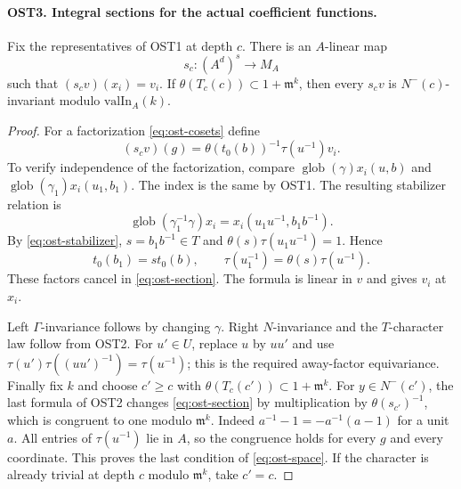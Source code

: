 \documentclass[11pt,a4paper]{article}
\numberwithin{equation}{section}
\theoremstyle{remark}\newtheorem{remark}[theorem]{Remark}
\begin{document}
\paragraph{OST3. Integral sections for the actual coefficient functions.}
\label{claim:OST3}
Fix the representatives of OST1 at depth $c$.  There is an
$A$-linear map
\[
 s_c:(A^d)^s\longrightarrow M_A
\]
such that $(s_c v)(x_i)=v_i$.  If
$\theta(T_c(c))\subset1+\mathfrak m^k$, then every $s_cv$ is
$N^-(c)$-invariant modulo $\mathrm{valIn}_A(k)$.
\begin{proof}
For a factorization \eqref{eq:ost-cosets} define
\begin{equation}\label{eq:ost-section}
 (s_cv)(g)=\theta(t_0(b))^{-1}\tau(u^{-1})v_i.
\end{equation}
To verify independence of the factorization, compare
$\operatorname{glob}(\gamma)x_i(u,\allowbreak{} b)$ and
$\operatorname{glob}(\gamma_1)x_i(u_1,\allowbreak{} b_1)$.  The index is the
same by OST1.  The resulting stabilizer relation is
\[
 \operatorname{glob}(\gamma_1^{-1}\gamma)x_i
       =x_i(u_1u^{-1},\allowbreak{} b_1b^{-1}).
\]
By \eqref{eq:ost-stabilizer}, $s=b_1b^{-1}\in T$ and
$\theta(s)\tau(u_1u^{-1})=1$.  Hence
\[
 t_0(b_1)=s t_0(b),\qquad
 \tau(u_1^{-1})=\theta(s)\tau(u^{-1}).
\]
These factors cancel in \eqref{eq:ost-section}.  The formula is
linear in $v$ and gives $v_i$ at $x_i$.

Left $\Gamma$-invariance follows by changing $\gamma$.
Right $N$-invariance and the $T$-character law follow from OST2.
For $u'\in U$, replace $u$ by $uu'$ and use
$\tau(u')\tau((uu')^{-1})=\tau(u^{-1})$; this is the required
away-factor equivariance.  Finally fix $k$ and choose
$c'\geq c$ with $\theta(T_c(c'))\subset1+\mathfrak m^k$.
For $y\in N^-(c')$, the last formula of OST2 changes
\eqref{eq:ost-section} by multiplication by
$\theta(s_{c'})^{-1}$, which is congruent to one modulo
$\mathfrak m^k$.  Indeed $a^{-1}-1=-a^{-1}(a-1)$ for a unit
$a$.  All entries of $\tau(u^{-1})$ lie in $A$, so the
congruence holds for every $g$ and every coordinate.  This proves
the last condition of \eqref{eq:ost-space}.  If the character is
already trivial at depth $c$ modulo $\mathfrak m^k$, take $c'=c$.
\end{proof}

\end{document}
